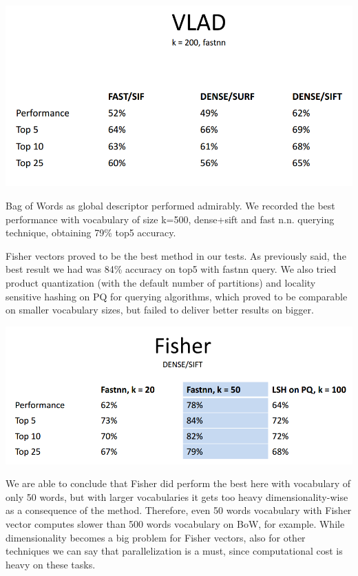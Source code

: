 \documentclass[11pt,a4paper,titlepage,twoside]{scrartcl}
\begin{document}
\centerline{\includegraphics[scale = 0.5]{figures/vlad.png}}

\par Bag of Words as global descriptor performed admirably. We recorded the best performance with vocabulary of size k=500, dense+sift and fast n.n. querying technique, obtaining 79\% top5 accuracy.
\par	Fisher vectors proved to be the best method in our tests. As previously said, the best result we had was 84\% accuracy on top5 with fastnn query. We also tried product quantization (with the default  number of partitions) and locality sensitive hashing on PQ for querying algorithms, which proved to be comparable on smaller vocabulary sizes, but failed to deliver better results on bigger.

\centerline{\includegraphics[scale = 0.5]{figures/fish.png}}

\par We are able to conclude that Fisher did perform the best here with vocabulary of only 50 words, but with larger vocabularies it gets too heavy dimensionality-wise as a consequence of the method. Therefore, even 50 words vocabulary with Fisher vector computes slower than 500 words vocabulary on BoW, for example. While dimensionality becomes a big problem for Fisher vectors, also for other techniques we can say that parallelization is a must, since computational cost is heavy on these tasks.
\end{document}
